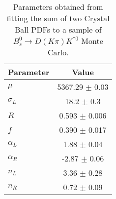 \begin{table}[h]
  \centering
  \begin{tabular}{lc}
      \toprule
      Parameter & Value \\
      \midrule
      $\mu$ & 5367.29 $\pm$ 0.03 \\
      $\sigma_L$ & 18.2 $\pm$ 0.3 \\
      $R$ & 0.593 $\pm$ 0.006 \\
      $f$ & 0.390 $\pm$ 0.017 \\
      $\alpha_L$ & 1.88 $\pm$ 0.04 \\
      $\alpha_R$ & -2.87 $\pm$ 0.06 \\
      $n_L$ & 3.36 $\pm$ 0.28 \\
      $n_R$ & 0.72 $\pm$ 0.09 \\
  \bottomrule
  \end{tabular}
  \caption{Parameters obtained from fitting the sum of two Crystal Ball PDFs to a sample of $B^0_s \to D(K\pi)K^{*0}$ Monte Carlo.}
\label{tab:signal_Bs_MC_params}
\end{table}
